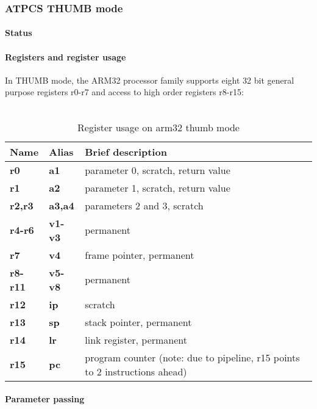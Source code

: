 \clearpage


\subsubsection{ATPCS THUMB mode}


\paragraph{Status}

\paragraph{Registers and register usage}

In THUMB mode, the ARM32 processor family supports eight 32 bit general purpose registers r0-r7 and access to high order registers r8-r15:\\
\\
\begin{table}[h]
\begin{tabular*}{0.95\textwidth}{lll}
Name         & Alias       & Brief description\\
\hline
{\bf r0}     & {\bf a1}    & parameter 0, scratch, return value\\
{\bf r1}     & {\bf a2}    & parameter 1, scratch, return value\\
{\bf r2,r3}  & {\bf a3,a4} & parameters 2 and 3, scratch\\
{\bf r4-r6}  & {\bf v1-v3} & permanent\\
{\bf r7}     & {\bf v4}    & frame pointer, permanent\\
{\bf r8-r11} & {\bf v5-v8} & permanent\\
{\bf r12}    & {\bf ip}    & scratch\\
{\bf r13}    & {\bf sp}    & stack pointer, permanent\\
{\bf r14}    & {\bf lr}    & link register, permanent\\
{\bf r15}    & {\bf pc}    & program counter (note: due to pipeline, r15 points to 2 instructions ahead)\\
\end{tabular*}
\caption{Register usage on arm32 thumb mode}
\end{table}

\paragraph{Parameter passing}

